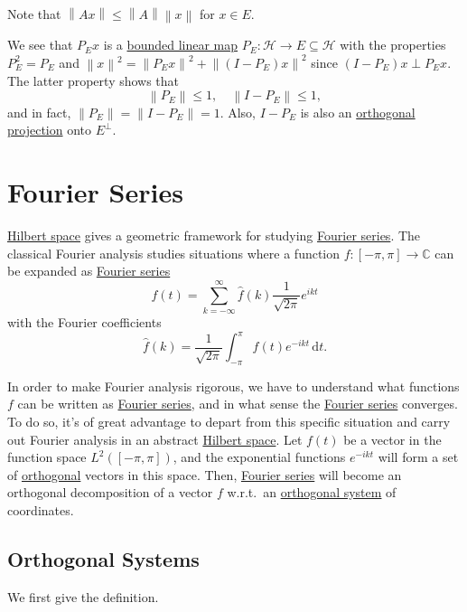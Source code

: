 \begin{remark}
	Note that \(\left\lVert Ax\right\rVert \leq \left\lVert A\right\rVert \left\lVert x\right\rVert \) for \(x\in E\).
\end{remark}

We see that \(P_E x\) is a \hyperref[def:bounded-linear-map]{bounded linear map} \(P_E\colon \mathcal{H} \to E\subseteq \mathcal{H}\) with the properties \(P^{2} _E = P_E\) and \(\left\lVert x\right\rVert ^{2} = \left\lVert P_E x\right\rVert ^{2} + \left\lVert (I - P_E)x\right\rVert ^{2} \) since \((I - P_E)x\perp P_E x\). The latter property shows that
\[
	\left\lVert P_E\right\rVert \leq 1,\quad \left\lVert I - P_E \right\rVert \leq 1,
\]
and in fact, \(\left\lVert P_E\right\rVert = \left\lVert I-P_E\right\rVert = 1\). Also, \(I - P_E\) is also an \hyperref[def:orthogonal-projection]{orthogonal projection} onto \(E^\perp\).

\section{Fourier Series}
\hyperref[def:Hilbert-space]{Hilbert space} gives a geometric framework for studying \hyperref[def:Fourier-series]{Fourier series}. The classical Fourier analysis studies situations where a function \(f\colon [-\pi , \pi ]\to \mathbb{C} \) can be expanded as \hyperref[def:Fourier-series]{Fourier series}
\[
	f(t) = \sum_{k=-\infty }^{\infty} \hat{f} (k) \frac{1}{\sqrt{2\pi } }e^{ikt}
\]
with the Fourier coefficients
\[
	\hat{f} (k) = \frac{1}{\sqrt{2\pi } }\int _{-\pi}^\pi f(t) e^{-ikt}\,\mathrm{d} t.
\]

In order to make Fourier analysis rigorous, we have to understand what functions \(f\) can be written as \hyperref[def:Fourier-series]{Fourier series}, and in what sense the \hyperref[def:Fourier-series]{Fourier series} converges. To do so, it's of great advantage to depart from this specific situation and carry out Fourier analysis in an abstract \hyperref[def:Hilbert-space]{Hilbert space}. Let \(f(t)\) be a vector in the function space \(L^2([-\pi , \pi ])\), and the exponential functions \(e^{-ikt}\) will form a set of \hyperref[def:orthogonal]{orthogonal} vectors in this space. Then, \hyperref[def:Fourier-series]{Fourier series} will become an orthogonal decomposition of a vector \(f\) w.r.t.\ an \hyperref[def:orthogonal-system]{orthogonal system} of coordinates.

\subsection{Orthogonal Systems}
We first give the definition.

